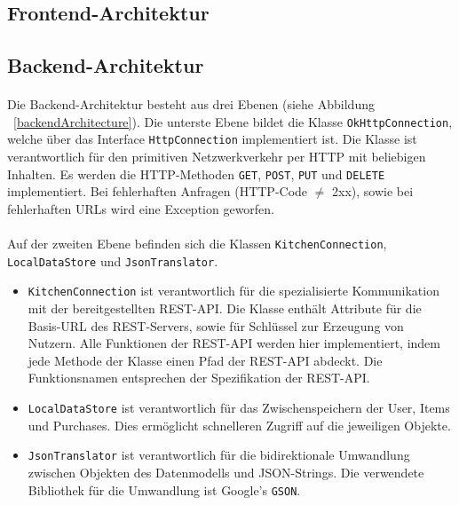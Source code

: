 \documentclass{scrartcl}
\begin{document}
		
		\subsection{Frontend-Architektur} \label{architecture.frontend}
		
		
		\subsection{Backend-Architektur} \label{architecture.backend}
			\paragraph*{}
			Die Backend-Architektur besteht aus drei Ebenen (siehe Abbildung ~\ref{backendArchitecture}). Die unterste Ebene bildet die Klasse \texttt{OkHttpConnection}, welche über das Interface \texttt{HttpConnection} implementiert ist. Die Klasse ist verantwortlich für den primitiven Netzwerkverkehr per HTTP mit beliebigen Inhalten. Es werden die HTTP-Methoden \texttt{GET}, \texttt{POST}, \texttt{PUT} und \texttt{DELETE} implementiert. Bei fehlerhaften Anfragen (HTTP-Code $\neq$ 2xx), sowie bei fehlerhaften URLs wird eine Exception geworfen.
			
			\paragraph*{}
			Auf der zweiten Ebene befinden sich die Klassen \texttt{KitchenConnection}, \texttt{LocalDataStore} und \texttt{JsonTranslator}.
			
			\begin{itemize}
				\item  \texttt{KitchenConnection} ist verantwortlich für die spezialisierte Kommunikation mit der bereitgestellten REST-API. Die Klasse enthält Attribute für die Basis-URL des REST-Servers, sowie für Schlüssel zur Erzeugung von Nutzern. Alle Funktionen der REST-API werden hier implementiert, indem jede Methode der Klasse einen Pfad der REST-API abdeckt. Die Funktionsnamen entsprechen der Spezifikation der REST-API.
				
				\item \texttt{LocalDataStore} ist verantwortlich für das Zwischenspeichern der User, Items und Purchases. Dies ermöglicht schnelleren Zugriff auf die jeweiligen Objekte.
				
				\item \texttt{JsonTranslator} ist verantwortlich für die bidirektionale Umwandlung zwischen Objekten des Datenmodells und JSON-Strings. Die verwendete Bibliothek für die Umwandlung ist Google's \texttt{GSON}.
			\end{itemize}
		
\end{document}
